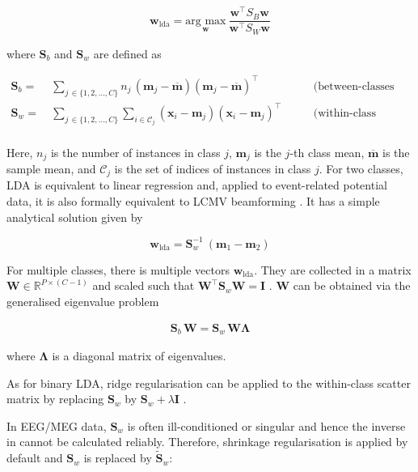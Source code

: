 \documentclass[utf8]{frontiersSCNS} %
\newcommand{\m}{\mathbf{m}}
\newcommand{\mbar}{\overline{\m}}
\newcommand{\mm}[1]{\m_{#1}}
\newcommand{\w}{\mathbf{w}}
\newcommand{\x}{\mathbf{x}}
\newcommand{\I}{\mathbf{I}}
\newcommand{\R}{\mathbb{R}}
\renewcommand{\S}{\mathbf{S}}
\newcommand{\W}{\mathbf{W}}
\begin{document}
\begin{equation}
\label{eq:fda}
\w_{\text{lda}} = \underset{\w}{\text{arg max}}\ \frac{\w^\top S_B\w}{\w^\top S_W\w}
\end{equation}

where $\S_b$ and $\S_w$ are defined as

\begin{equation*}
\begin{alignedat}{2}
\S_b =\ & \sum_{j\,\in\{1,2,...,C\}}n_j\,(\mm{j} -\mbar) (\mm{j} - \mbar)^\top\ \quad &&\text{(between-classes scatter)}\\
\S_w =\ & \sum_{j\,\in\{1,2,...,C\}}\sum_{i\in\mathcal{C}_j} (\x_i - \mm{j})(\x_i - \mm{j})^\top\  \quad &&\text{(within-class scatter)}\\
\end{alignedat}
\end{equation*}

Here, $n_j$ is the number of instances in class $j$, $\m_j$ is the $j$-th class mean, $\mbar$ is the sample mean, and $\mathcal{C}_j$ is the set of indices of instances in class $j$. For two classes, LDA is equivalent to linear regression \citep{Treder2019DirectFDA} and, applied to event-related potential data, it is also formally equivalent to LCMV beamforming \citep{Treder2016}. It has a simple analytical solution given by

\begin{equation}
\label{eq:lda_solution}
\w_{\text{lda}} = \S_w^{-1}\ (\m_1 - \m_2)
\end{equation}

For multiple classes, there is multiple vectors $\w_{\text{lda}}$. They are collected in a matrix $\W\in\R^{P\times(C-1)}$ and scaled such that $\W^\top\S_w\W = \I$ \citep{Bishop2007}. $\W$ can be obtained via the generalised eigenvalue problem

\begin{align}
\label{eq:LDA-eigenvalue-multiclass}
\S_b\,\W = \S_w\,\W\mathbf{\Lambda}
\end{align}

where $\mathbf{\Lambda}$ is a diagonal matrix of eigenvalues.

As for binary LDA, ridge regularisation can be applied to the within-class scatter matrix by replacing $\S_w$ by $\S_w+\lambda\I$ \citep{Friedman1989}.

In EEG/MEG data, $\S_w$ is often ill-conditioned or singular and hence the inverse in  cannot be calculated reliably. Therefore, shrinkage regularisation is applied by default and $\S_w$ is replaced by $\widetilde{\S}_w$:
\end{document}
